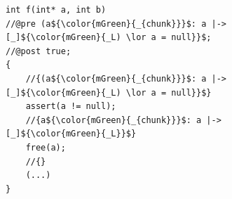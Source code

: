 \documentclass{beamer}
\begin{document}
\begin{frame}[fragile]
\begin{columns}
\begin{column}{0.08\textwidth}
\end{column}

\begin{column}{0.56\textwidth}

\begin{figure}[h]
  \centering
\begin{lstlisting}[style=CStyleNoNum, captionpos = t,title = Source]
int f(int* a, int b)
//@pre (a${\color{mGreen}{_{chunk}}}$: a |-> [_]${\color{mGreen}{_L) \lor a = null}}$;
//@post true;
{
	//{(a${\color{mGreen}{_{chunk}}}$: a |-> [_]${\color{mGreen}{_L) \lor a = null}}$}
	assert(a != null);
	//{a${\color{mGreen}{_{chunk}}}$: a |-> [_]${\color{mGreen}{_L}}$}
	free(a);
	//{}
	(...)
}
\end{lstlisting}
\end{figure}   

\end{column}
\end{columns}

\end{frame}
\end{document}
